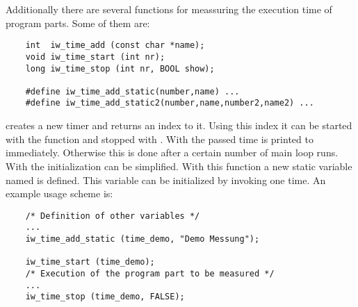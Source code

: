 Additionally there are several functions for meassuring the
execution time of program parts. Some of them are:
\begin{small}
\linespread{0.9}
\begin{verbatim}
    int  iw_time_add (const char *name);
    void iw_time_start (int nr);
    long iw_time_stop (int nr, BOOL show);

    #define iw_time_add_static(number,name) ...
    #define iw_time_add_static2(number,name,number2,name2) ...
\end{verbatim}
\end{small}
 creates a new timer and returns an index to
it. Using this index it can be started with the function
 and stopped with
. With  the passed time is
printed to  immediately. Otherwise this is done after a
certain number of \icewing{} main loop runs. With
 the initialization can be
simplified. With this function a new static variable named
 is defined. This variable can be initialized by
invoking  one time. An example usage scheme is:
\begin{small}
\linespread{0.9}
\begin{verbatim}
    /* Definition of other variables */
    ...
    iw_time_add_static (time_demo, "Demo Messung");

    iw_time_start (time_demo);
    /* Execution of the program part to be measured */
    ...
    iw_time_stop (time_demo, FALSE);
\end{verbatim}
\end{small}

